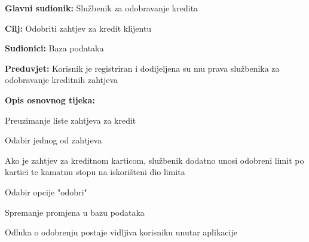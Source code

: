                \noindent {}
                \begin{packed_item}
                	
                	\item \textbf{Glavni sudionik: } Službenik za odobravanje kredita
                	\item  \textbf{Cilj:} Odobriti zahtjev za kredit klijentu
                	\item  \textbf{Sudionici:} Baza podataka
                	\item  \textbf{Preduvjet:} Korisnik je registriran i dodijeljena su mu prava službenika za odobravanje kreditnih zahtjeva 
                	\item  \textbf{Opis osnovnog tijeka:}
                	
                	\item[] \begin{packed_enum}
                		
                		\item Preuzimanje liste zahtjeva za kredit
                		\item Odabir jednog od zahtjeva
                		\begin{packed_enum}
                			\item Ako je zahtjev za kreditnom karticom, službenik dodatno unosi odobreni limit po kartici te kamatnu stopu na iskorišteni dio limita
                		\end{packed_enum}
                		\item Odabir opcije "odobri"
                		\item Spremanje promjena u bazu podataka
                		\item Odluka o odobrenju postaje vidljiva korisniku unutar aplikacije
                		
                	\end{packed_enum}
                \end{packed_item}
            
